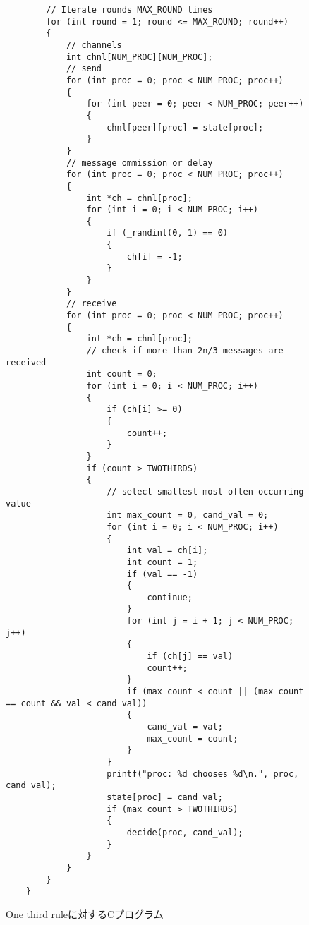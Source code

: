 \documentclass[technicalreport]{ieicej}
\theoremstyle{plain}
\begin{document}
\begin{figure*}
{\begin{lstlisting}
        // Iterate rounds MAX_ROUND times
        for (int round = 1; round <= MAX_ROUND; round++)
        {
            // channels
            int chnl[NUM_PROC][NUM_PROC];
            // send
            for (int proc = 0; proc < NUM_PROC; proc++)
            {
                for (int peer = 0; peer < NUM_PROC; peer++)
                {
                    chnl[peer][proc] = state[proc];
                }
            }
            // message ommission or delay
            for (int proc = 0; proc < NUM_PROC; proc++)
            {
                int *ch = chnl[proc];
                for (int i = 0; i < NUM_PROC; i++)
                {
                    if (_randint(0, 1) == 0)
                    {
                        ch[i] = -1;
                    }
                }
            }
            // receive
            for (int proc = 0; proc < NUM_PROC; proc++)
            {
                int *ch = chnl[proc];
                // check if more than 2n/3 messages are received
                int count = 0;
                for (int i = 0; i < NUM_PROC; i++)
                {
                    if (ch[i] >= 0)
                    {
                        count++;
                    }
                }
                if (count > TWOTHIRDS)
                {
                    // select smallest most often occurring value
                    int max_count = 0, cand_val = 0;
                    for (int i = 0; i < NUM_PROC; i++)
                    {
                        int val = ch[i];
                        int count = 1;
                        if (val == -1)
                        {
                            continue;
                        }
                        for (int j = i + 1; j < NUM_PROC; j++)
                        {
                            if (ch[j] == val)
                            count++;
                        }
                        if (max_count < count || (max_count == count && val < cand_val))
                        {
                            cand_val = val;
                            max_count = count;
                        }
                    }
                    printf("proc: %d chooses %d\n.", proc, cand_val);
                    state[proc] = cand_val;
                    if (max_count > TWOTHIRDS)
                    {
                        decide(proc, cand_val);
                    }
                }
            }
        }
    }
\end{lstlisting}}
\caption{One third ruleに対するCプログラム}\label{fig:cprogram}
\end{figure*}
\end{document}
